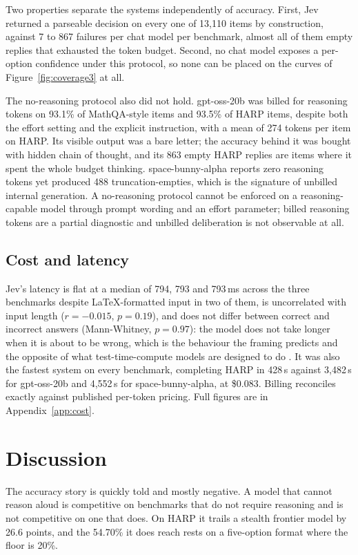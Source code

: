 \documentclass[11pt]{article}
\begin{document}
Two properties separate the systems independently of accuracy. First, Jev returned a parseable decision on every one of 13,110 items by construction, against 7 to 867 failures per chat model per benchmark, almost all of them empty replies that exhausted the token budget. Second, no chat model exposes a per-option confidence under this protocol, so none can be placed on the curves of Figure~\ref{fig:coverage3} at all.

The no-reasoning protocol also did not hold. gpt-oss-20b was billed for reasoning tokens on 93.1\% of MathQA-style items and 93.5\% of HARP items, despite both the effort setting and the explicit instruction, with a mean of 274 tokens per item on HARP. Its visible output was a bare letter; the accuracy behind it was bought with hidden chain of thought, and its 863 empty HARP replies are items where it spent the whole budget thinking. space-bunny-alpha reports zero reasoning tokens yet produced 488 truncation-empties, which is the signature of unbilled internal generation. A no-reasoning protocol cannot be enforced on a reasoning-capable model through prompt wording and an effort parameter; billed reasoning tokens are a partial diagnostic and unbilled deliberation is not observable at all.

\subsection{Cost and latency}
\label{sec:cost}

Jev's latency is flat at a median of 794, 793 and 793\,ms across the three benchmarks despite LaTeX-formatted input in two of them, is uncorrelated with input length ($r = -0.015$, $p = 0.19$), and does not differ between correct and incorrect answers (Mann-Whitney, $p = 0.97$): the model does not take longer when it is about to be wrong, which is the behaviour the framing predicts and the opposite of what test-time-compute models are designed to do \citep{openai2024o1}. It was also the fastest system on every benchmark, completing HARP in 428\,s against 3{,}482\,s for gpt-oss-20b and 4{,}552\,s for space-bunny-alpha, at \$0.083. Billing reconciles exactly against published per-token pricing. Full figures are in Appendix~\ref{app:cost}.

\section{Discussion}
\label{sec:discussion}

The accuracy story is quickly told and mostly negative. A model that cannot reason aloud is competitive on benchmarks that do not require reasoning and is not competitive on one that does. On HARP it trails a stealth frontier model by 26.6 points, and the 54.70\% it does reach rests on a five-option format where the floor is 20\%.
\end{document}
